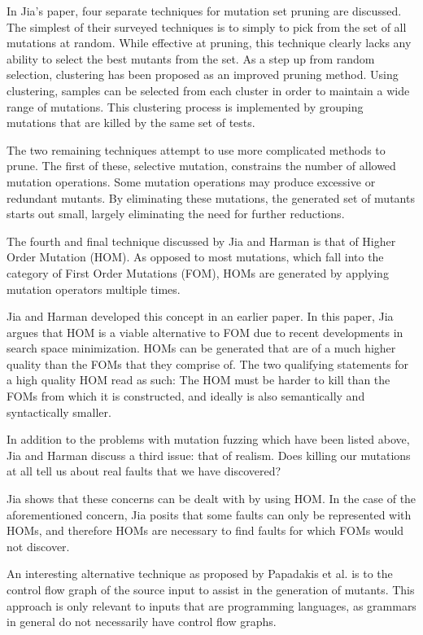 In Jia's paper, four separate techniques for mutation set pruning are
discussed. The simplest of their surveyed techniques is to simply to
pick from the set of all mutations at random. While effective at pruning, this
technique clearly lacks any ability to select the best mutants from
the set. As a step up from random selection, clustering has been
proposed as an improved pruning method. Using clustering, samples can
be selected from each cluster in order to maintain a wide range of
mutations. This clustering process is implemented by grouping
mutations that are killed by the same set of tests.

The two remaining techniques attempt to use more complicated methods
to prune. The first of these, selective mutation, constrains the
number of allowed mutation operations. Some mutation operations may produce excessive or
redundant mutants. By eliminating these mutations, the generated set
of mutants starts out small, largely eliminating the need for further
reductions.

The fourth and final technique discussed  by Jia and Harman is that of
Higher Order Mutation (HOM). As opposed to most mutations, which fall
into the category of First Order Mutations (FOM), HOMs are generated
by applying mutation operators multiple times.

Jia and Harman developed this concept in an earlier paper. \cite{Harman2010}
In this paper, Jia argues that HOM is a viable alternative to FOM due
to recent developments in search space minimization. HOMs can be
generated that are of a much higher quality than the FOMs that they
comprise of. The two qualifying statements for a high quality HOM read
as such: The HOM must be harder to kill than the FOMs from which it is
constructed, and ideally is also semantically and syntactically
smaller.

In addition to the problems with mutation fuzzing which have been
listed above, Jia and Harman discuss a third issue: that of
realism. Does killing our mutations at all tell us about real faults
that we have discovered?

Jia shows that these concerns can be dealt with by using HOM. In the
case of the aforementioned concern, Jia posits that some faults can
only be represented with HOMs, and therefore HOMs are necessary to
find faults for which FOMs would not discover.


An interesting alternative technique as proposed by Papadakis et
al. is to the control flow graph of the source input to assist in the
generation of mutants.\cite{Papadakis2010} This approach is only
relevant to inputs that are programming languages, as grammars in
general do not necessarily have control flow graphs.

